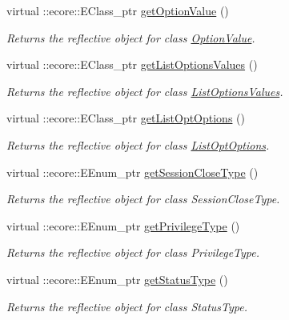 \begin{DoxyCompactItemize}
virtual ::ecore::EClass\_\-ptr \hyperlink{classUMS__Data_1_1UMS__DataPackage_a693cc3187bb1dc28846f2d9c8efe4284}{getOptionValue} ()
\begin{DoxyCompactList}\small\item\em Returns the reflective object for class \hyperlink{classUMS__Data_1_1OptionValue}{OptionValue}. \item\end{DoxyCompactList}\item 
virtual ::ecore::EClass\_\-ptr \hyperlink{classUMS__Data_1_1UMS__DataPackage_aac078127b32c4c25869a1d86c9aba5d0}{getListOptionsValues} ()
\begin{DoxyCompactList}\small\item\em Returns the reflective object for class \hyperlink{classUMS__Data_1_1ListOptionsValues}{ListOptionsValues}. \item\end{DoxyCompactList}\item 
virtual ::ecore::EClass\_\-ptr \hyperlink{classUMS__Data_1_1UMS__DataPackage_a12fe240a70913d81ae0deb2c5e441c58}{getListOptOptions} ()
\begin{DoxyCompactList}\small\item\em Returns the reflective object for class \hyperlink{classUMS__Data_1_1ListOptOptions}{ListOptOptions}. \item\end{DoxyCompactList}\item 
virtual ::ecore::EEnum\_\-ptr \hyperlink{classUMS__Data_1_1UMS__DataPackage_ac4b077ecfac1e09318d85451e1264445}{getSessionCloseType} ()
\begin{DoxyCompactList}\small\item\em Returns the reflective object for class SessionCloseType. \item\end{DoxyCompactList}\item 
virtual ::ecore::EEnum\_\-ptr \hyperlink{classUMS__Data_1_1UMS__DataPackage_a4c7d8c663c98662bb572ce6622b3fd15}{getPrivilegeType} ()
\begin{DoxyCompactList}\small\item\em Returns the reflective object for class PrivilegeType. \item\end{DoxyCompactList}\item 
virtual ::ecore::EEnum\_\-ptr \hyperlink{classUMS__Data_1_1UMS__DataPackage_a13c943633c31b5d453f701ccf574a8f8}{getStatusType} ()
\begin{DoxyCompactList}\small\item\em Returns the reflective object for class StatusType. \item\end{DoxyCompactList}\item 

\end{DoxyCompactItemize}
